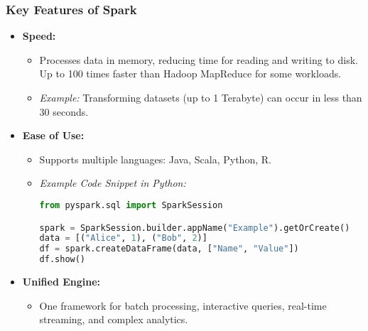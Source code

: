 \documentclass[aspectratio=169]{beamer}
\begin{document}
\begin{frame}[fragile]
    \frametitle{Key Features of Spark}
    \begin{itemize}
        \item \textbf{Speed:}
        \begin{itemize}
            \item Processes data in memory, reducing time for reading and writing to disk. Up to 100 times faster than Hadoop MapReduce for some workloads.
            \item \textit{Example:} Transforming datasets (up to 1 Terabyte) can occur in less than 30 seconds.
        \end{itemize}
        
        \item \textbf{Ease of Use:}
        \begin{itemize}
            \item Supports multiple languages: Java, Scala, Python, R.
            \item \textit{Example Code Snippet in Python:}
            \begin{lstlisting}[language=Python]
from pyspark.sql import SparkSession

spark = SparkSession.builder.appName("Example").getOrCreate()
data = [("Alice", 1), ("Bob", 2)]
df = spark.createDataFrame(data, ["Name", "Value"])
df.show()
            \end{lstlisting}
        \end{itemize}
        
        \item \textbf{Unified Engine:} 
        \begin{itemize}
            \item One framework for batch processing, interactive queries, real-time streaming, and complex analytics.
        \end{itemize}
    \end{itemize}
\end{frame}
\end{document}
